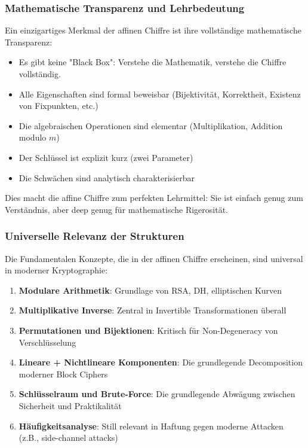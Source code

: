 ﻿\documentclass[12pt,a4paper]{article}
\begin{document}
	\subsubsection{Mathematische Transparenz und Lehrbedeutung}
	
	Ein einzigartiges Merkmal der affinen Chiffre ist ihre vollständige mathematische Transparenz:
	
	\begin{itemize}
		\item Es gibt keine "Black Box": Verstehe die Mathematik, verstehe die Chiffre vollständig.
		\item Alle Eigenschaften sind formal beweisbar (Bijektivität, Korrektheit, Existenz von Fixpunkten, etc.)
		\item Die algebraischen Operationen sind elementar (Multiplikation, Addition modulo $m$)
		\item Der Schlüssel ist explizit kurz (zwei Parameter)
		\item Die Schwächen sind analytisch charakterisierbar
	\end{itemize}
	
	Dies macht die affine Chiffre zum perfekten Lehrmittel: Sie ist einfach genug zum Verständnis, aber deep genug für mathematische Rigerosität.
	
	\subsubsection{Universelle Relevanz der Strukturen}
	
	Die Fundamentalen Konzepte, die in der affinen Chiffre erscheinen, sind universal in moderner Kryptographie:
	
	\begin{enumerate}
		\item \textbf{Modulare Arithmetik}: Grundlage von RSA, DH, elliptischen Kurven
		\item \textbf{Multiplikative Inverse}: Zentral in Invertible Transformationen überall
		\item \textbf{Permutationen und Bijektionen}: Kritisch für Non-Degeneracy von Verschlüsselung
		\item \textbf{Lineare + Nichtlineare Komponenten}: Die grundlegende Decomposition moderner Block Ciphers
		\item \textbf{Schlüsselraum und Brute-Force}: Die grundlegende Abwägung zwischen Sicherheit und Praktikalität
		\item \textbf{Häufigkeitsanalyse}: Still relevant in Haftung gegen moderne Attacken (z.B., side-channel attacks)
	\end{enumerate}
	
\end{document}
